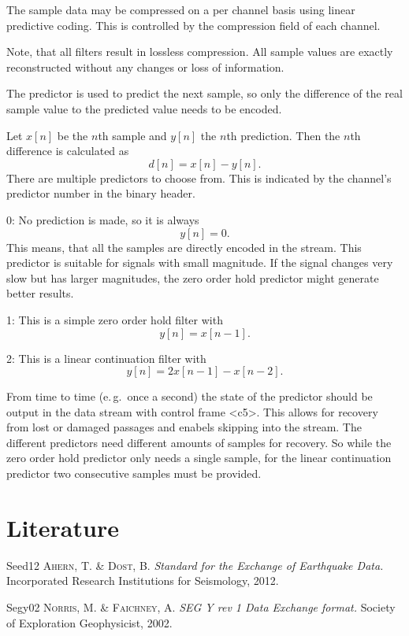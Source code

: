 \documentclass[DIV=10]{scrartcl}
\newcommand\litref[1]{\textref{[#1]}}
\newenvironment{refliterature}
{\list{}{
  \setlength{\leftmargin}{45pt}
  \setlength{\labelwidth}{45pt}
  \setlength{\labelsep}{0pt}
  \setlength{\itemindent}{0pt}
  \setlength{\itemsep}{-2pt}
  \let\makelabel\litref
}\RaggedRight}
{\endlist}
\begin{document}
The sample data may be compressed on a per channel basis using linear predictive coding.
This is controlled by the compression field of each channel.

Note, that all filters result in lossless compression.
All sample values are exactly reconstructed without any changes or loss of information.

The predictor is used to predict the next sample, so only the difference of the real sample value to the predicted value needs to be encoded.

Let \(x[n]\) be the \(n\)th sample and \(y[n]\) the \(n\)th prediction.
Then the \(n\)th difference is calculated as
\[
  d[n] = x[n] - y[n].
\]
There are multiple predictors to choose from.
This is indicated by the channel’s predictor number in the binary header.

0: No prediction is made, so it is always
\[
  y[n] = 0.
\]
This means, that all the samples are directly encoded in the stream.
This predictor is suitable for signals with small magnitude.
If the signal changes very slow but has larger magnitudes, the zero order hold predictor might generate better results.

1: This is a simple zero order hold filter with
\[
  y[n] = x[n - 1].
\]

2: This is a linear continuation filter with
\[
  y[n] = 2x[n - 1] - x[n - 2].
\]

From time to time (e.\,g.\ once a second) the state of the predictor should be output in the data stream with control frame <c5>.
This allows for recovery from lost or damaged passages and enabels skipping into the stream.
The different predictors need different amounts of samples for recovery.
So while the zero order hold predictor only needs a single sample, for the linear continuation predictor two consecutive samples must be provided.

\section{Literature}

\begin{refliterature}
\item[Seed12] \textsc{Ahern, T. \& Dost, B.} \textit{Standard for the Exchange of Earthquake Data.} Incorporated Research Institutions for Seismology, 2012.
\item[Segy02] \textsc{Norris, M. \& Faichney, A.} \textit{SEG Y rev 1 Data Exchange format.} Society of Exploration Geophysicist, 2002.
\end{refliterature}
\end{document}
